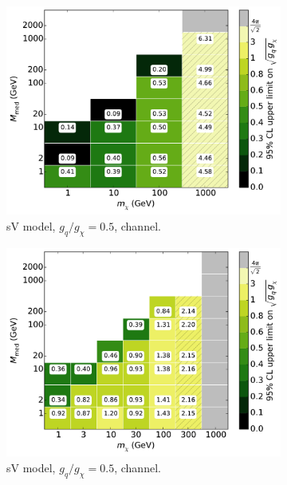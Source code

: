\begin{figure}
  \centering
  \begin{subfigure}[t]{0.32\textwidth}
    \centering
    \includegraphics[width=1.\textwidth]{figures/grid_basepoints_SVD_rat2_monojet.pdf}
    \caption{sV model, $g_q/g_{\chi} = 0.5$, \monojet channel.}
  \end{subfigure}
  \begin{subfigure}[t]{0.32\textwidth}
    \centering
    \includegraphics[width=1.\textwidth]{figures/grid_allpoints_SVD_rat2.pdf}
    \caption{sV model, $g_q/g_{\chi} = 0.5$, \monoZ channel.}
  \end{subfigure}
  \begin{subfigure}[t]{0.32\textwidth}

\end{subfigure}
\end{figure}
